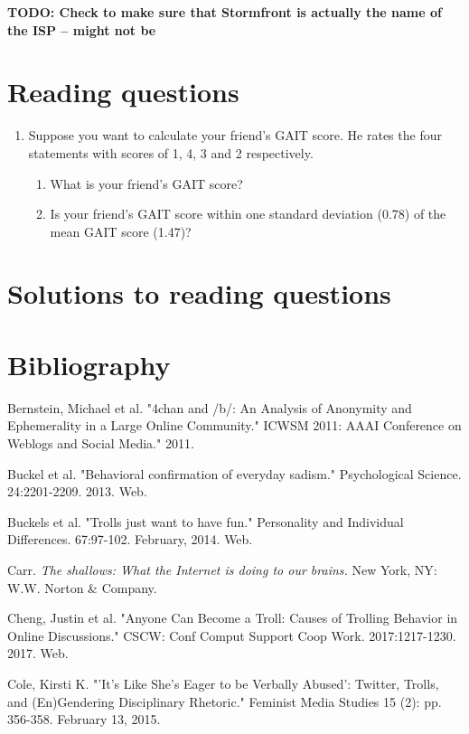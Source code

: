 \documentclass[class=book, crop=false]{standalone}
\begin{document}
\textbf{TODO: Check to make sure that Stormfront is actually the name of the ISP -- might not be}

\section{Reading questions}

\begin{enumerate}
    \item Suppose you want to calculate your friend's GAIT score. He rates the four statements with scores of 1, 4, 3 and 2 respectively.
    \begin{enumerate}
        \item What is your friend's GAIT score?
        \item Is your friend's GAIT score within one standard deviation (0.78) of the mean GAIT score (1.47)?
    \end{enumerate}
\end{enumerate}

\section{Solutions to reading questions}

\section{Bibliography}

Bernstein, Michael et al. "4chan and /b/: An Analysis of Anonymity and Ephemerality in a Large Online Community." ICWSM 2011: AAAI Conference on Weblogs and Social Media." 2011.

Buckel et al. "Behavioral confirmation of everyday sadism." Psychological Science. 24:2201-2209. 2013. Web.

Buckels et al. "Trolls just want to have fun." Personality and Individual Differences. 67:97-102. February, 2014. Web.

Carr. \textit{The shallows: What the Internet is doing to our brains.} New York, NY: W.W. Norton \& Company.

Cheng, Justin et al. "Anyone Can Become a Troll: Causes of Trolling Behavior in Online Discussions." CSCW: Conf Comput Support Coop Work. 2017:1217-1230. 2017. Web.

Cole, Kirsti K. "'It's Like She's Eager to be Verbally Abused': Twitter, Trolls, and (En)Gendering Disciplinary Rhetoric." Feminist Media Studies 15 (2): pp. 356-358. February 13, 2015.
\end{document}
